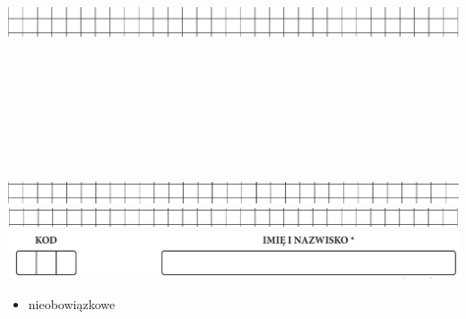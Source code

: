 \documentclass[10pt]{article}
\begin{document}
\includegraphics[max width=\textwidth, center]{2024_11_21_4a1915d79134dda0750eg-20}\\
\(\qquad\)\\
\(\qquad\)\\
\(\qquad\)\\
\(\qquad\)\\
\(\qquad\)\\
\(\qquad\)\\
\(\qquad\)\\
\(\qquad\)\\
\includegraphics[max width=\textwidth, center]{2024_11_21_4a1915d79134dda0750eg-20(1)}\\
\includegraphics[max width=\textwidth, center]{2024_11_21_4a1915d79134dda0750eg-20(2)}\\
\includegraphics[max width=\textwidth, center]{2024_11_21_4a1915d79134dda0750eg-21}

\begin{itemize}
  \item nieobowiązkowe
\end{itemize}
\end{document}

